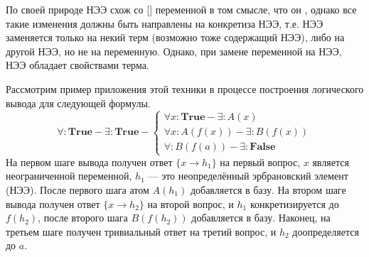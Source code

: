 По своей природе НЭЭ схож со [] переменной в том смысле, что он , однако все такие изменения должны быть направлены  на конкретиза НЭЭ, т.е. НЭЭ заменяется только на некий терм (возможно тоже содержащий НЭЭ), либо на другой НЭЭ, но не на переменную. Однако, при замене переменной на НЭЭ, НЭЭ обладает  свойствами терма.

Рассмотрим пример приложения этой техники в процессе построения логического вывода для следующей формулы.
\begin{equation}
	\forall\colon\boldsymbol{True} - \exists\colon\boldsymbol{True} -
	\left\lbrace
	\begin{array}{l}
		\forall x\colon\boldsymbol{True} - \exists\colon A(x) \\
		\forall x\colon A(f(x)) - \exists\colon B(f(x)) \\
		\forall\colon B(f(a)) - \exists\colon \boldsymbol{False}
	\end{array}\right.
\end{equation}
На первом шаге вывода получен ответ $\{x \rightarrow h_1\}$ на первый вопрос, $x$ является неограниченной переменной, $h_1$ --- это неопределённый эрбрановский элемент (НЭЭ). После первого шага атом $A(h_1)$ добавляется в базу. На втором шаге вывода получен ответ $\{x \rightarrow h_2\}$ на второй вопрос, и $h_1$ конкретизируется до $f(h_2)$, после второго шага $B(f(h_2))$ добавляется в базу. Наконец, на третьем шаге получен тривиальный ответ на третий вопрос, и $h_2$ доопределяется до $a$.

